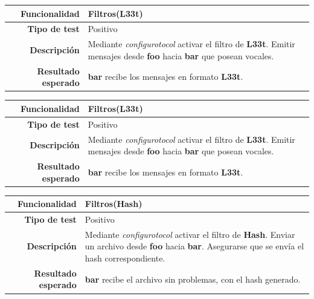 \documentclass[a4paper,10pt]{article}
\begin{document}
\begin{center}
  \begin{tabular}{|r|p{12.5cm}|}
    \hline
    \textbf{Funcionalidad}	&	Filtros(L33t)\\
    \hline
    \textbf{Tipo de test}	&	Positivo\\
    \hline
    \textbf{Descripción}	&	Mediante \textit{configurotocol} activar el filtro de \textbf{L33t}. 
					Emitir mensajes desde \textbf{foo} hacia \textbf{bar} que posean vocales.\\
    \hline
    \textbf{Resultado esperado}	&	\textbf{bar} recibe los mensajes en formato \textbf{L33t}.\\
    \hline   
  \end{tabular}
\end{center}

\begin{center}
  \begin{tabular}{|r|p{12.5cm}|}
    \hline
    \textbf{Funcionalidad}	&	Filtros(L33t)\\
    \hline
    \textbf{Tipo de test}	&	Positivo\\
    \hline
    \textbf{Descripción}	&	Mediante \textit{configurotocol} activar el filtro de \textbf{L33t}. 
					Emitir mensajes desde \textbf{foo} hacia \textbf{bar} que posean vocales.\\
    \hline
    \textbf{Resultado esperado}	&	\textbf{bar} recibe los mensajes en formato \textbf{L33t}.\\
    \hline   
  \end{tabular}
\end{center}

\begin{center}
  \begin{tabular}{|r|p{12.5cm}|}
    \hline
    \textbf{Funcionalidad}	&	Filtros(Hash)\\
    \hline
    \textbf{Tipo de test}	&	Positivo\\
    \hline
    \textbf{Descripción}	&	Mediante \textit{configurotocol} activar el filtro de \textbf{Hash}. 
					Enviar un archivo desde \textbf{foo} hacia \textbf{bar}. Asegurarse que 
					se envía el hash correspondiente.\\
    \hline
    \textbf{Resultado esperado}	&	\textbf{bar} recibe el archivo sin problemas, con el hash generado.\\
    \hline   
  \end{tabular}
\end{center}
\end{document}
